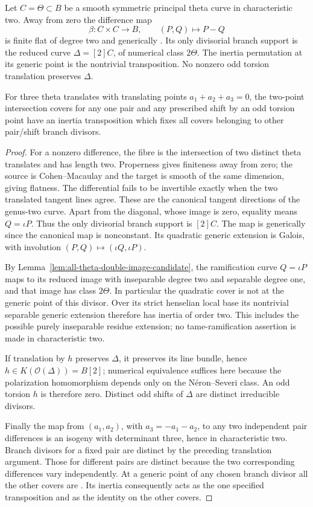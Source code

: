 \begin{lemma}
\label{lem:theta-difference-cover-char2-candidate}
Let $C=\Theta\subset B$ be a smooth symmetric principal theta
curve in characteristic two. Away from zero the difference map
\[
            \beta:C\times C\longrightarrow B,\qquad(P,Q)\mapsto P-Q
\]
is finite flat of degree two and generically \etale. Its only
divisorial branch support is the reduced curve
$\Delta=[2]C$, of numerical class $2\Theta$.
The inertia permutation at its generic point is the nontrivial
transposition. No nonzero odd torsion translation preserves
$\Delta$.

For three theta translates with translating points
$a_1+a_2+a_3=0$, the two-point intersection covers for any one
pair and any prescribed shift by an odd torsion point have an
inertia transposition which fixes all covers belonging to other
pair/shift branch divisors.
\end{lemma}
\begin{proof}
For a nonzero difference, the fibre is the intersection of two
distinct theta translates and has length two. Properness gives
finiteness away from zero; the source is Cohen--Macaulay and the
target is smooth of the same dimension, giving flatness.
The differential fails to be invertible exactly when the two
translated tangent lines agree. These are the canonical tangent
directions of the genus-two curve. Apart from the diagonal, whose
image is zero, equality means $Q=\iota P$. Thus the only
divisorial branch support is $[2]C$.
The map is generically \etale since the canonical map is
nonconstant. Its quadratic generic extension is Galois, with
involution $(P,Q)\mapsto(\iota Q,\iota P)$.

By Lemma~\ref{lem:all-theta-double-image-candidate}, the ramification
curve $Q=\iota P$ maps to its reduced image with inseparable
degree two and separable degree one, and that image has class
$2\Theta$. In particular the quadratic cover is not \etale at
the generic point of this divisor. Over its strict henselian
local base its nontrivial separable generic extension therefore
has inertia of order two. This includes the possible purely
inseparable residue extension; no tame-ramification assertion
is made in characteristic two.

If translation by $h$ preserves $\Delta$, it preserves its line
bundle, hence $h\in K(\mathcal O(\Delta))=B[2]$; numerical
equivalence suffices here because the polarization homomorphism
depends only on the N\'eron--Severi class. An odd torsion $h$ is
therefore zero. Distinct odd shifts of $\Delta$ are distinct
irreducible divisors.

Finally the map from $(a_1,a_2)$, with $a_3=-a_1-a_2$, to any
two independent pair differences is an isogeny with determinant
three, hence \etale in characteristic two. Branch divisors
for a fixed pair are distinct by the preceding translation
argument. Those for different pairs are distinct because the
two corresponding differences vary independently. At a generic
point of any chosen branch divisor all the other covers are
\etale. Its inertia consequently acts as the one specified
transposition and as the identity on the other covers.
\end{proof}

